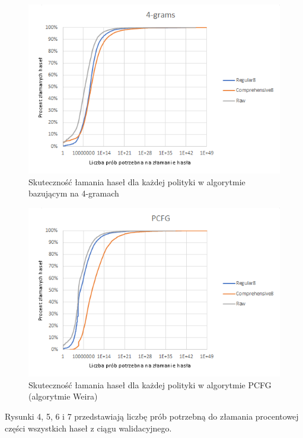 \documentclass{article}
\begin{document}
	\begin{figure}[H]
		\centering
		\includegraphics{4grams}
		\caption{Skuteczność łamania haseł dla każdej polityki w algorytmie bazującym na 4-gramach}
	\end{figure}

	\begin{figure}[H]
		\centering
		\includegraphics{PCFG}
		\caption{Skuteczność łamania haseł dla każdej polityki w algorytmie PCFG (algorytmie Weira)}
	\end{figure}

	Rysunki 4, 5, 6 i 7 przedstawiają liczbę prób potrzebną do złamania procentowej części wszystkich haseł z ciągu walidacyjnego.

	\newpage
\end{document}
